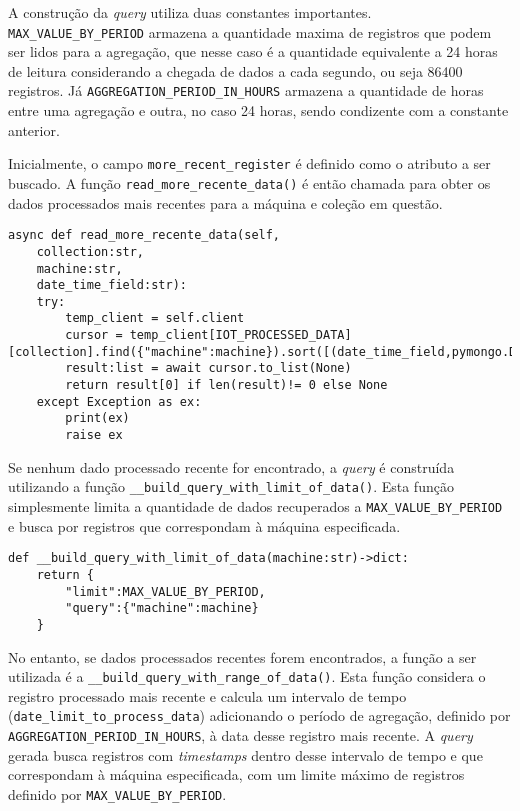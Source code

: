 A construção da \textit{query} utiliza duas constantes importantes. \texttt{MAX\_VALUE\_BY\_PERIOD} armazena a quantidade maxima de registros que podem ser lidos para a agregação, que nesse caso é a quantidade equivalente a 24 horas de leitura considerando a chegada de dados a cada segundo, ou  seja 86400 registros. Já \texttt{AGGREGATION\_PERIOD\_IN\_HOURS} armazena a quantidade de horas entre uma agregação e outra, no caso 24 horas, sendo condizente com a constante anterior. 

Inicialmente, o campo \texttt{more\_recent\_register} é definido como o atributo a ser buscado. A função \texttt{read\_more\_recente\_data()} é então chamada para obter os dados processados mais recentes para a máquina e coleção em questão.

\begin{verbatim}
async def read_more_recente_data(self,
    collection:str,
    machine:str,
    date_time_field:str):
    try:
        temp_client = self.client
        cursor = temp_client[IOT_PROCESSED_DATA][collection].find({"machine":machine}).sort([(date_time_field,pymongo.DESCENDING)])
        result:list = await cursor.to_list(None)
        return result[0] if len(result)!= 0 else None
    except Exception as ex:
        print(ex)
        raise ex
\end{verbatim}

Se nenhum dado processado recente for encontrado, a \textit{query} é construída utilizando a função \texttt{\_\_build\_query\_with\_limit\_of\_data()}. Esta função simplesmente limita a quantidade de dados recuperados a \texttt{MAX\_VALUE\_BY\_PERIOD} e busca por registros que correspondam à máquina especificada.

\begin{verbatim}
def __build_query_with_limit_of_data(machine:str)->dict:
    return {
        "limit":MAX_VALUE_BY_PERIOD,
        "query":{"machine":machine}
    }
\end{verbatim}


No entanto, se dados processados recentes forem encontrados, a função a ser utilizada é a \texttt{\_\_build\_query\_with\_range\_of\_data()}. Esta função considera o registro processado mais recente e calcula um intervalo de tempo (\texttt{date\_limit\_to\_process\_data}) adicionando o período de agregação, definido por \texttt{AGGREGATION\_PERIOD\_IN\_HOURS}, à data desse registro mais recente. A \textit{query} gerada busca registros com \textit{timestamps} dentro desse intervalo de tempo e que correspondam à máquina especificada, com um limite máximo de 
registros definido por \texttt{MAX\_VALUE\_BY\_PERIOD}.

